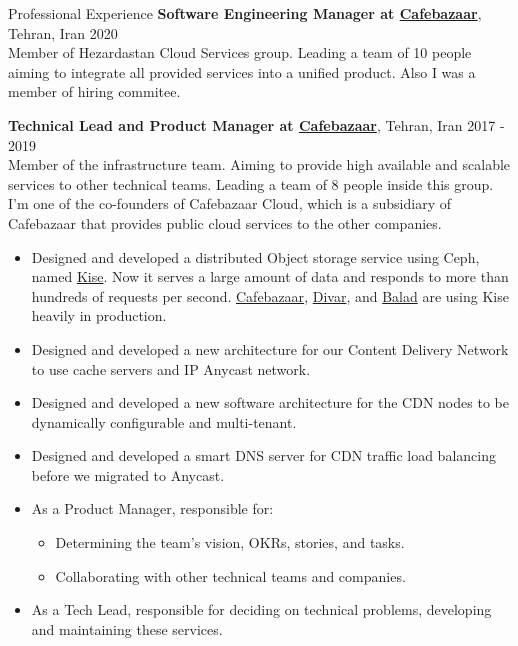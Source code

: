 \documentclass{resume} %
\begin{document}
\begin{rSection}{Professional Experience}
	{\bf Software Engineering Manager at \href{https://cafebazaar.ir/}{Cafebazaar}}, Tehran, Iran \hfill 2020
	\\ Member of Hezardastan Cloud Services group. Leading a team of 10 people aiming to integrate all provided services into a unified product. Also I was a member of hiring commitee.
	
	{\bf Technical Lead and Product Manager at \href{https://cafebazaar.ir/}{Cafebazaar}}, Tehran, Iran \hfill 2017 - 2019
	\\ Member of the infrastructure team. Aiming to provide high available and scalable services to other technical teams. Leading a team of 8 people inside this group. I'm one of the co-founders of Cafebazaar Cloud, which is a subsidiary of Cafebazaar that provides public cloud services to the other companies.
	\begin{itemize}
		\item Designed and developed a distributed Object storage service using Ceph, named \href{https://kise.roo.cloud/}{Kise}. Now it serves a large amount of data and responds to more than hundreds of requests per second. \href{https://cafebazaar.ir/}{Cafebazaar}, \href{https://divar.ir/}{Divar}, and \href{http://balad.ir/}{Balad} are using Kise heavily in production.
		\item Designed and developed a new architecture for our Content Delivery Network to use cache servers and IP Anycast network.
		\item Designed and developed a new software architecture for the CDN nodes to be dynamically configurable and multi-tenant.
		\item Designed and developed a smart DNS server for CDN traffic load balancing before we migrated to Anycast.
		\item As a Product Manager, responsible for:
		\begin{itemize}
			\item Determining the team's vision, OKRs, stories, and tasks.
			\item Collaborating with other technical teams and companies.
		\end{itemize}
		\item As a Tech Lead, responsible for deciding on technical problems, developing and maintaining these services.
	\end{itemize}
	

\end{rSection}
\end{document}
